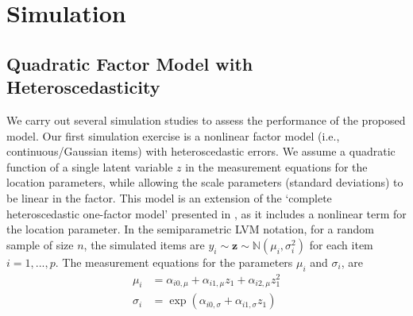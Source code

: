 \documentclass[11pt, a4paper]{article}
\begin{document}






\section{Simulation}

\subsection{Quadratic Factor Model with Heteroscedasticity}

We carry out several simulation studies to assess the performance of the proposed model. Our first simulation exercise is a nonlinear factor model (i.e., continuous/Gaussian items) with heteroscedastic errors. We assume a quadratic function of a single latent variable $z$ in the measurement equations for the location parameters, while allowing the scale parameters (standard deviations) to be linear in the factor. This model is an extension of the `complete heteroscedastic one-factor model' presented in \citet{Hessen&Dolan_BJMSP2009}, as it includes a nonlinear term for the location parameter. In the semiparametric LVM notation, for a random sample of size $n$, the simulated items are $y_{i} \sim \mathbf{z} \sim \mathbb{N}(\mu_{i}, \sigma^2_{i})$ for each item $i = 1,...,p$. The measurement equations for the parameters $\mu_i$ and $\sigma_i$,  are
\begin{align*}
\mu_i & = \alpha_{i0,\mu} + \alpha_{i1,\mu} z_1 + \alpha_{i2,\mu} z_1^2 \\
\sigma_i & = \exp(\alpha_{i0,\sigma} + \alpha_{i1,\sigma} z_1)
\end{align*}
\end{document}
